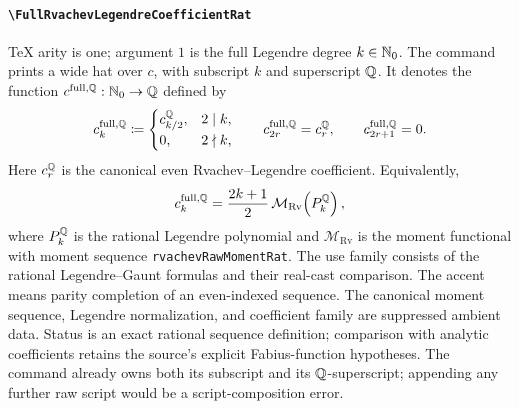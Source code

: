\documentclass[11pt,oneside]{article}
\theoremstyle{definition}
\theoremstyle{remark}
\DeclareRobustCommand{\commandname}[1]{\texttt{\textbackslash#1}}
\DeclareRobustCommand{\localaccentname}[1]{\commandname{#1}}
\begin{document}
\paragraph{\localaccentname{FullRvachevLegendreCoefficientRat}}
TeX arity is one; argument \(1\) is the full Legendre degree
\(k\in\mathbb{N}_{0}\).  The command prints a wide hat over \(c\), with
subscript \(k\) and superscript \(\mathbb{Q}\).  It denotes the function
\(c^{\mathrm{full},\mathbb{Q}}:\mathbb{N}_{0}\to\mathbb{Q}\)
defined by
\[
 c_k^{\mathrm{full},\mathbb{Q}}
 \mathrel{\coloneqq}
 \begin{cases}
  c_{k/2}^{\mathbb{Q}},&2\mid k,\\
  0,&2\nmid k,
 \end{cases}
 \qquad
 c_{2r}^{\mathrm{full},\mathbb{Q}}=c_r^{\mathbb{Q}},
 \qquad
 c_{2r+1}^{\mathrm{full},\mathbb{Q}}=0.
\]
Here \(c_r^{\mathbb{Q}}\) is the canonical even Rvachev--Legendre
coefficient.  Equivalently,
\[
 c_k^{\mathrm{full},\mathbb{Q}}
 =
 \frac{2k+1}{2}\,
 \mathcal M_{\mathrm{Rv}}\!\left(P_k^{\mathbb{Q}}\right),
\]
where \(P_k^{\mathbb{Q}}\) is the rational Legendre polynomial and
\(\mathcal M_{\mathrm{Rv}}\) is the moment functional with moment sequence
\texttt{rvachevRawMomentRat}.  The use family consists of the rational
Legendre--Gaunt formulas and their real-cast comparison.  The accent means
parity completion of an even-indexed sequence.  The canonical moment sequence,
Legendre normalization, and coefficient family are suppressed ambient data.
Status is an exact rational sequence definition; comparison with analytic coefficients
retains the source's explicit Fabius-function hypotheses.
The command already owns both its subscript and its
\(\mathbb{Q}\)-superscript; appending any further raw script would be a
script-composition error.
\end{document}
